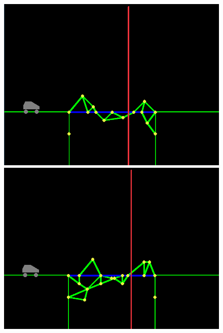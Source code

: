 \begin{figure}[ht]
    \centering
    \begin{minipage}{0.24\textwidth}
        \centering
        \includegraphics[width=\linewidth]{img/bridge_p1.png}
    \end{minipage}\hfill
    \begin{minipage}{0.24\textwidth}
        \centering
        \includegraphics[width=\linewidth]{img/bridge_p2.png}
    \end{minipage}
    \begin{minipage}{0.24\textwidth}
        \centering

\end{minipage}
\end{figure}
